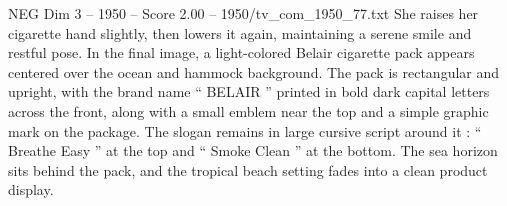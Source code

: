 \begin{textsample}{NEG Dim 3 – 1950 – Score 2.00 – 1950/tv\_com\_1950\_77.txt}
She raises her cigarette hand slightly, then lowers it again, maintaining a serene smile and restful pose.
In the final image, a light-colored Belair cigarette pack appears centered over the ocean and hammock background.
The pack is rectangular and upright, with the brand name “ BELAIR ” printed in bold dark capital letters across the front, along with a small emblem near the top and a simple graphic mark on the package.
The slogan remains in large cursive script around it : “ Breathe Easy ” at the top and “ Smoke Clean ” at the bottom.
The sea horizon sits behind the pack, and the tropical beach setting fades into a clean product display.

\end{textsample}
